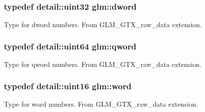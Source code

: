 \subsubsection[{\texorpdfstring{dword}{dword}}]{\setlength{\rightskip}{0pt plus 5cm}typedef detail\+::uint32 {\bf glm\+::dword}}\hypertarget{group__gtx__raw__data_ga1fc2589df6d44e923cd1820cf14805cf}{}\label{group__gtx__raw__data_ga1fc2589df6d44e923cd1820cf14805cf}
Type for dword numbers. From G\+L\+M\+\_\+\+G\+T\+X\+\_\+raw\+\_\+data extension. 
\subsubsection[{\texorpdfstring{qword}{qword}}]{\setlength{\rightskip}{0pt plus 5cm}typedef detail\+::uint64 {\bf glm\+::qword}}\hypertarget{group__gtx__raw__data_ga32447af289e879589883c9b7e3be1246}{}\label{group__gtx__raw__data_ga32447af289e879589883c9b7e3be1246}
Type for qword numbers. From G\+L\+M\+\_\+\+G\+T\+X\+\_\+raw\+\_\+data extension. 
\subsubsection[{\texorpdfstring{word}{word}}]{\setlength{\rightskip}{0pt plus 5cm}typedef detail\+::uint16 {\bf glm\+::word}}\hypertarget{group__gtx__raw__data_ga5617a479d471021b5c773c5e969ba46d}{}\label{group__gtx__raw__data_ga5617a479d471021b5c773c5e969ba46d}
Type for word numbers. From G\+L\+M\+\_\+\+G\+T\+X\+\_\+raw\+\_\+data extension. 